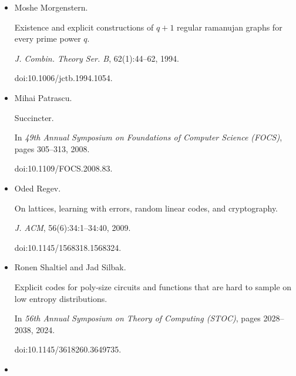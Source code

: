 \begin{itemize}
Local recovery in data compression for general sources.


In \emph{2015 IEEE International Symposium on Information Theory
(ISIT)}, pages 2984–2988, 2015.


doi:10.1109/ISIT.2015.7283004.





\item[] 
[36]

Moshe Morgenstern.


Existence and explicit constructions of $q+1$ regular ramanujan
graphs for every prime power $q$.


\emph{J. Combin. Theory Ser. B}, 62(1):44–62, 1994.


doi:10.1006/jctb.1994.1054.





\item[] 
[37]

Mihai Patrascu.


Succincter.


In \emph{49th Annual Symposium on Foundations of Computer Science
(FOCS)}, pages 305–313, 2008.


doi:10.1109/FOCS.2008.83.





\item[] 
[38]

Oded Regev.


On lattices, learning with errors, random linear codes, and
cryptography.


\emph{J. ACM}, 56(6):34:1–34:40, 2009.


doi:10.1145/1568318.1568324.





\item[] 
[39]

Ronen Shaltiel and Jad Silbak.


Explicit codes for poly-size circuits and functions that are hard to
sample on low entropy distributions.


In \emph{56th Annual Symposium on Theory of Computing (STOC)}, pages
2028–2038, 2024.


doi:10.1145/3618260.3649735.





\item[] 
[40]


\end{itemize}
